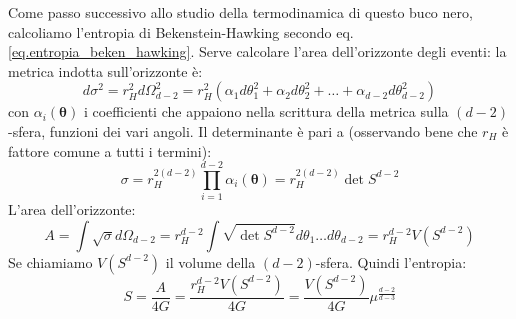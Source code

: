 Come passo successivo allo studio della termodinamica di questo buco nero, calcoliamo l'entropia di Bekenstein-Hawking secondo eq. \ref{eq.entropia_beken_hawking}. Serve calcolare l'area dell'orizzonte degli eventi: la metrica indotta sull'orizzonte è:
\begin{equation*}
    d\sigma^2 = r_H^2d\Omega_{d-2}^2 = r_H^2( \alpha_1 d\theta_1^2 + \alpha_2 d\theta_2^2 + \dots + \alpha_{d-2}d\theta_{d-2}^2)
\end{equation*}
con $\alpha_i(\bm\theta)$ i coefficienti che appaiono nella scrittura della metrica sulla $(d-2)$-sfera, funzioni dei vari angoli. Il determinante è pari a (osservando bene che $r_H$ è fattore comune a tutti i termini):
\begin{equation}
    \sigma = r_H^{2(d-2)}\prod_{i=1}^{d-2}\alpha_i(\bm\theta) = r_H^{2(d-2)}\det S^{d-2}
    \label{eq.sigma_indotta_scha_tang}
\end{equation}
L'area dell'orizzonte:
\begin{equation*}
    A = \int \sqrt{\sigma}d\Omega_{d-2} =  r_H^{d-2} \int\sqrt{\det S^{d-2}}d\theta_1\dots d\theta_{d-2} = r_{H}^{d-2}V(S^{d-2})
\end{equation*}
Se chiamiamo $V(S^{d-2})$ il volume della $(d-2)$-sfera. Quindi l'entropia:
\begin{equation}
    S = \frac{A}{4G} = \frac{r_H^{d-2}V(S^{d-2})}{4G} = \frac{V(S^{d-2})}{4G}\mu^{\frac{d-2}{d-3}}
    \label{eq.entropia_schwarz_tangherlini}
\end{equation}

